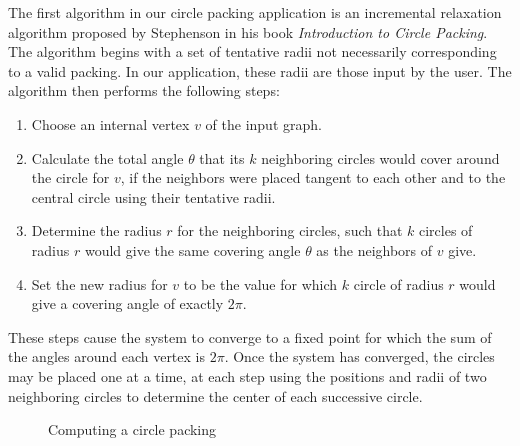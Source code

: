 \documentclass[11pt]{article}
\theoremstyle{definition}
\begin{document}
	The first algorithm in our circle packing application is an incremental relaxation algorithm proposed by Stephenson in his book \emph{Introduction to Circle Packing}. 
	The algorithm begins with a set of tentative radii not necessarily corresponding to a valid packing. In our application, these radii are those input by the user. 
	The algorithm then performs the following steps:
	
	\begin{enumerate}
		\item Choose an internal vertex $v$ of the input graph.
		\item Calculate the total angle $\theta$ that its $k$ neighboring circles would cover around the circle for $v$, if the neighbors were placed tangent to each other and to the central circle using their tentative radii.
		\item Determine the radius $r$ for the neighboring circles, such that $k$ circles of radius $r$ would give the same covering angle $\theta$ as the neighbors of $v$ give.
		\item Set the new radius for $v$ to be the value for which $k$ circle of radius $r$ would give a covering angle of exactly $2\pi$.
	\end{enumerate}
	
	These steps cause the system to converge to a fixed point for which the sum of the angles around each vertex is $2\pi$. 
	Once the system has converged, the circles may be placed one at a time, at each step using the positions and radii of two neighboring circles to determine the center of each successive circle.

	\begin{figure}[H]%
    		\centering
    		\qquad
    		\caption{Computing a circle packing}%
    		\label{fig:inout}%
	\end{figure}
\end{document}
